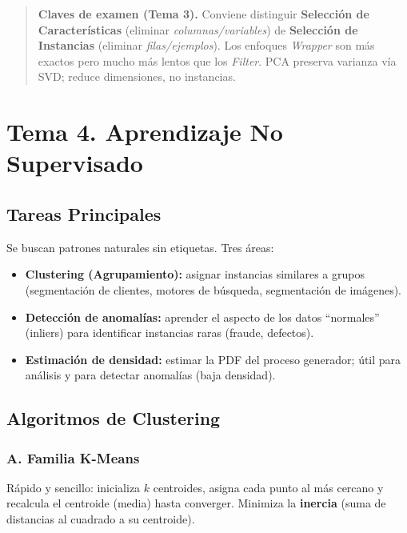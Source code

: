 \documentclass[12pt]{book} %
\providecommand{\tightlist}{%
  \setlength{\itemsep}{0pt}\setlength{\parskip}{0pt}}
\begin{document}
\begin{quote}
\textbf{Claves de examen (Tema 3).} Conviene distinguir
\textbf{Selección de Características} (eliminar
\emph{columnas/variables}) de \textbf{Selección de Instancias} (eliminar
\emph{filas/ejemplos}). Los enfoques \emph{Wrapper} son más exactos pero
mucho más lentos que los \emph{Filter}. PCA preserva varianza vía SVD;
reduce dimensiones, no instancias.
\end{quote}

\hypertarget{tema-4.-aprendizaje-no-supervisado}{%
\section{Tema 4. Aprendizaje No
Supervisado}\label{tema-4.-aprendizaje-no-supervisado}}

\hypertarget{tareas-principales}{%
\subsection{Tareas Principales}\label{tareas-principales}}

Se buscan patrones naturales sin etiquetas. Tres áreas:

\begin{itemize}
\tightlist
\item
  \textbf{Clustering (Agrupamiento):} asignar instancias similares a
  grupos (segmentación de clientes, motores de búsqueda, segmentación de
  imágenes).
\item
  \textbf{Detección de anomalías:} aprender el aspecto de los datos
  ``normales'' (inliers) para identificar instancias raras (fraude,
  defectos).
\item
  \textbf{Estimación de densidad:} estimar la PDF del proceso generador;
  útil para análisis y para detectar anomalías (baja densidad).
\end{itemize}

\hypertarget{algoritmos-de-clustering}{%
\subsection{Algoritmos de Clustering}\label{algoritmos-de-clustering}}

\hypertarget{a.-familia-k-means}{%
\subsubsection{A. Familia K-Means}\label{a.-familia-k-means}}

Rápido y sencillo: inicializa \(k\) centroides, asigna cada punto al más
cercano y recalcula el centroide (media) hasta converger. Minimiza la
\textbf{inercia} (suma de distancias al cuadrado a su centroide).
\end{document}
